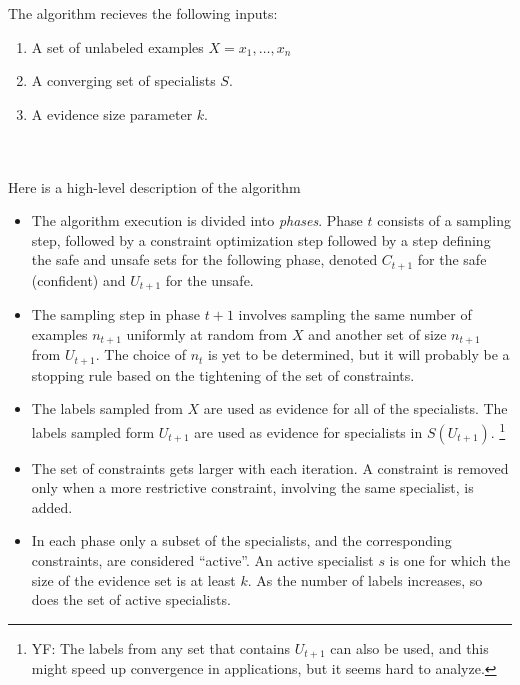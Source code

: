 \documentclass{article}
\begin{document}
The algorithm recieves the following inputs:
\begin{enumerate}
\item A set of unlabeled examples $X={x_1,\ldots,x_n}$
\item A converging set of specialists $S$.
\item A evidence size parameter $k$.
\end{enumerate}
~\\
~\\
\noindent
Here is a high-level description of the algorithm
\begin{itemize}
\item
The algorithm execution is divided into {\em phases}. Phase $t$
consists of a sampling step, followed by a constraint optimization
step followed by a step defining the safe and unsafe sets for the
following phase, denoted $C_{t+1}$ for the safe (confident) and
$U_{t+1}$ for the unsafe.
\item
The sampling step in phase $t+1$ involves sampling the same number of
examples $n_{t+1}$ uniformly at random from $X$ and another set of size
$n_{t+1}$ from $U_{t+1}$. The choice of $n_t$ is yet to be determined,
but it will probably be a stopping rule based on the tightening of the
set of constraints.
\item
The labels sampled from $X$ are used as evidence for all of the
specialists. The labels sampled form $U_{t+1}$ are used as evidence
for specialists in $S(U_{t+1})$. \footnote{YF: The labels from any set
  that contains $U_{t+1}$ can also be used, and this might speed up
  convergence in applications, but it seems hard to analyze.}
\item
The set of constraints gets larger with each iteration. A constraint
is removed only when a more restrictive constraint, involving the same
specialist, is added.
\item
In each phase only a subset of the specialists, and the corresponding
constraints, are considered ``active''. An active specialist $s$ is
one for which the size of the evidence set is at least $k$. As the
number of labels increases, so does the set of active specialists. 
\end{itemize}
\end{document}
